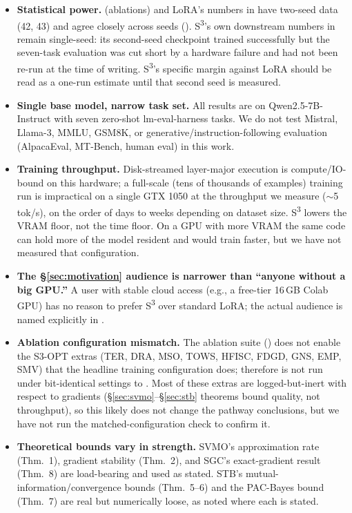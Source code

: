 \documentclass[conference]{IEEEtran}
\newcommand{\sthree}{S\textsuperscript{3}}
\begin{document}
\begin{itemize}[leftmargin=*]
    \item \textbf{Statistical power.}  (ablations) and LoRA's numbers in  have two-seed data (42, 43) and agree closely across seeds (). \sthree{}'s own downstream numbers in  remain single-seed: its second-seed checkpoint trained successfully but the seven-task evaluation was cut short by a hardware failure and had not been re-run at the time of writing. \sthree{}'s specific margin against LoRA should be read as a one-run estimate until that second seed is measured.
    \item \textbf{Single base model, narrow task set.} All results are on Qwen2.5-7B-Instruct with seven zero-shot lm-eval-harness tasks. We do not test Mistral, Llama-3, MMLU, GSM8K, or generative/instruction-following evaluation (AlpacaEval, MT-Bench, human eval) in this work.
    \item \textbf{Training throughput.} Disk-streamed layer-major execution is compute/IO-bound on this hardware; a full-scale (tens of thousands of examples) training run is impractical on a single GTX 1050 at the throughput we measure ($\sim$5 tok/s), on the order of days to weeks depending on dataset size. \sthree{} lowers the VRAM floor, not the time floor. On a GPU with more VRAM the same code can hold more of the model resident and would train faster, but we have not measured that configuration.
    \item \textbf{The \S\ref{sec:motivation} audience is narrower than ``anyone without a big GPU.''} A user with stable cloud access (e.g., a free-tier 16\,GB Colab GPU) has no reason to prefer \sthree{} over standard LoRA; the actual audience is named explicitly in .
    \item \textbf{Ablation configuration mismatch.} The ablation suite () does not enable the S3-OPT extras (TER, DRA, MSO, TOWS, HFISC, FDGD, GNS, EMP, SMV) that the headline training configuration does;  therefore is not run under bit-identical settings to . Most of these extras are logged-but-inert with respect to gradients (\S\ref{sec:svmo}--\S\ref{sec:stb} theorems bound quality, not throughput), so this likely does not change the pathway conclusions, but we have not run the matched-configuration check to confirm it.
    \item \textbf{Theoretical bounds vary in strength.} SVMO's approximation rate (Thm.~1), gradient stability (Thm.~2), and SGC's exact-gradient result (Thm.~8) are load-bearing and used as stated. STB's mutual-information/convergence bounds (Thm.~5--6) and the PAC-Bayes bound (Thm.~7) are real but numerically loose, as noted where each is stated.
\end{itemize}
\end{document}
